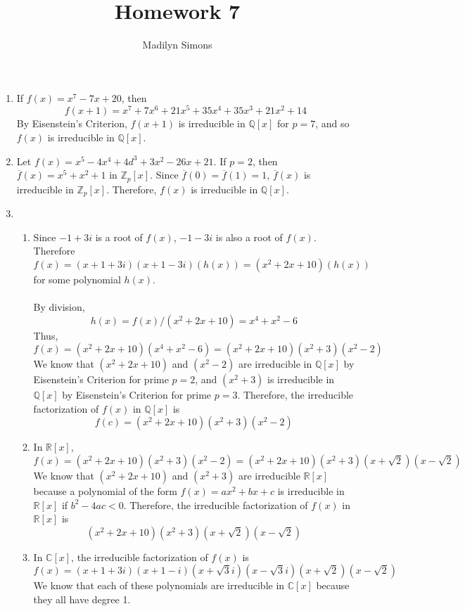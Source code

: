 \documentclass{article}
\title{Homework 7}
\author{Madilyn Simons}
\date{}
\begin{document}
\maketitle

\begin{enumerate}

\item If $f(x) = x^7 - 7x + 20$, then
\[
f(x+1) = x^7 + 7x^6 + 21x^5 + 35x^4 + 35x^3 + 21x^2 + 14
\]
By Eisenstein's Criterion, $f(x + 1)$ is irreducible in $\mathbb{Q}[x]$ for $p = 7$,
and so $f(x)$ is irreducible in $\mathbb{Q}[x]$.

\item Let $f(x) = x^5 - 4x^4 + 4d^3 + 3x^2 -26x + 21$.
If $p = 2$, then $\overline{f}(x) = x^5 + x^2 + 1$ in $\mathbb{Z}_{p}[x]$.
Since $\overline{f}(0) = \overline{f}(1) = 1$, $\overline{f}(x)$ is
irreducible in $\mathbb{Z}_{p}[x]$.  Therefore, $f(x)$ is
irreducible in $\mathbb{Q}[x]$.

\item
\begin{enumerate}
\item
Since $-1 + 3i$ is a root of $f(x)$, $-1 - 3i$ is also a root of $f(x)$.
Therefore
\[
f(x) = (x + 1 + 3i)(x + 1 - 3i)(h(x)) = (x^2 + 2x + 10)(h(x))
\] for
some polynomial $h(x)$.
\\ \\
By division,
\[h(x) = f(x) / (x^2 + 2x + 10) = x^4 + x^2 - 6
\]
Thus,
\[f(x) = (x^2 + 2x + 10)(x^4 + x^2 - 6) = (x^2 + 2x + 10)(x^2 + 3)(x^2 - 2)
\]
We know that $(x^2 + 2x + 10)$ and $(x^2 - 2)$ are irreducible in $\mathbb{Q}[x]$
by Eisenstein's Criterion for prime $p = 2$, and $(x^2 + 3)$ is irreducible
in $\mathbb{Q}[x]$ by Eisenstein's Criterion for prime $p = 3$.
Therefore, the irreducible
factorization of $f(x)$ in $\mathbb{Q}[x]$ is
\[
f(c) = (x^2 + 2x + 10)(x^2 + 3)(x^2 - 2)
\]

\item
In $\mathbb{R}[x]$,
\[f(x) = (x^2 + 2x + 10)(x^2 + 3)(x^2 - 2)
= (x^2 + 2x + 10)(x^2 + 3)(x + \sqrt{2})(x - \sqrt{2})
\]
We know that $(x^2 + 2x + 10)$ and $(x^2 + 3)$ are irreducible $\mathbb{R}[x]$
because a polynomial of the form $f(x) = ax^2 + bx + c$ is irreducible in
$\mathbb{R}[x]$ if $b^2 - 4ac < 0$.  Therefore, the irreducible factorization
of $f(x)$ in $\mathbb{R}[x]$ is
\[
(x^2 + 2x + 10)(x^2 + 3)(x + \sqrt{2})(x - \sqrt{2})
\]

\item
In $\mathbb{C}[x]$, the irreducible factorization of $f(x)$ is
\[
f(x) = (x + 1 + 3i)(x + 1 - i)(x + \sqrt{3}i)(x - \sqrt{3}i)(x + \sqrt{2})(x - \sqrt{2})
\]
We know that each of these polynomials are irreducible in $\mathbb{C}[x]$ because
they all have degree 1.

\end{enumerate}
\end{enumerate}
\end{document}
